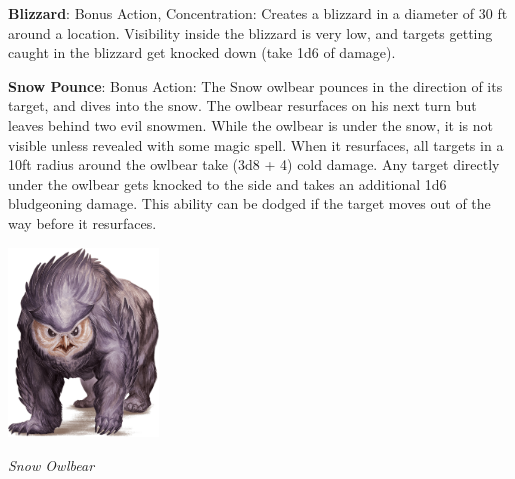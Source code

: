\noindent\textbf{Blizzard}: Bonus Action, Concentration: Creates a blizzard in a diameter of 30 ft around a location. Visibility inside the blizzard is very low, and targets getting caught in the blizzard get knocked down (take 1d6 of damage).

\noindent\textbf{Snow Pounce}: Bonus Action: The Snow owlbear pounces in the direction of its target, and dives into the snow. The owlbear resurfaces on his next turn but leaves behind two evil snowmen. While the owlbear is under the snow, it is not visible unless revealed with some magic spell. When it resurfaces, all targets in a 10ft radius around the owlbear take (3d8 + 4) cold damage. Any target directly under the owlbear gets knocked to the side and takes an additional 1d6 bludgeoning damage. This ability can be dodged if the target moves out of the way before it resurfaces.

\begin{center}
	\includegraphics[width = 0.3\textwidth]{owlbear}
	
	\emph{Snow Owlbear}
\end{center}